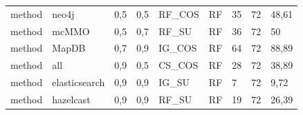 \begin{table}[H]
{\begin{tabular}{lllllllll}
method         & neo4j                          & 0,5        & 0,5           & RF\_COS                  & RF             & 35                & 72                     & 48,61       \\
method         & mcMMO                          & 0,5        & 0,7           & RF\_SU                   & RF             & 36                & 72                     & 50          \\
method         & MapDB                          & 0,7        & 0,9           & IG\_COS                  & RF             & 64                & 72                     & 88,89       \\
method         & all                            & 0,9        & 0,5           & CS\_COS                  & RF             & 28                & 72                     & 38,89       \\
method         & elasticsearch                  & 0,9        & 0,9           & IG\_SU                   & RF             & 7                 & 72                     & 9,72        \\
method         & hazelcast                      & 0,9        & 0,9           & RF\_SU                   & RF             & 19                & 72                     & 26,39      
\end{tabular}
}
\end{table}